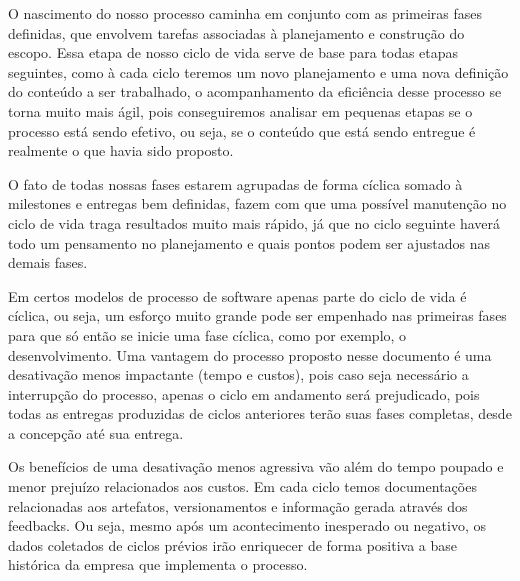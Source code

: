\documentclass[	DIV=calc,%
							paper=a4,%
							fontsize=12pt,%
							onecolumn]{scrartcl}	 					%
\begin{document}
O nascimento do nosso processo caminha em conjunto com as primeiras fases definidas, que envolvem tarefas associadas à planejamento e construção do escopo. Essa etapa de nosso ciclo de vida serve de base para todas etapas seguintes, como à cada ciclo teremos um novo planejamento e uma nova definição do conteúdo a ser trabalhado, o acompanhamento da eficiência desse processo se torna muito mais ágil, pois conseguiremos analisar em pequenas etapas se o processo está sendo efetivo, ou seja, se o conteúdo que está sendo entregue é realmente o que havia sido proposto. 

O fato de todas nossas fases estarem agrupadas de forma cíclica somado à milestones e entregas bem definidas, fazem com que uma possível manutenção no ciclo de vida traga resultados muito mais rápido, já que no ciclo seguinte haverá todo um pensamento no planejamento e quais pontos podem ser ajustados nas demais fases. 

Em certos modelos de processo de software apenas parte do ciclo de vida é cíclica, ou seja, um esforço muito grande pode ser empenhado nas primeiras fases para que só então se inicie uma fase cíclica, como por exemplo, o desenvolvimento.  Uma vantagem do processo proposto nesse documento é uma desativação menos impactante (tempo e custos), pois caso seja necessário a interrupção do processo, apenas o ciclo em andamento será prejudicado, pois todas as entregas produzidas de ciclos anteriores terão suas fases completas, desde a concepção até sua entrega. 

Os benefícios de uma desativação menos agressiva vão além do tempo poupado e menor prejuízo relacionados aos custos. Em cada ciclo temos documentações relacionadas aos artefatos, versionamentos e informação gerada através dos feedbacks. Ou seja, mesmo após um acontecimento inesperado ou negativo, os dados coletados de ciclos prévios irão enriquecer de forma positiva a base histórica da empresa que implementa o processo. 
\end{document}
